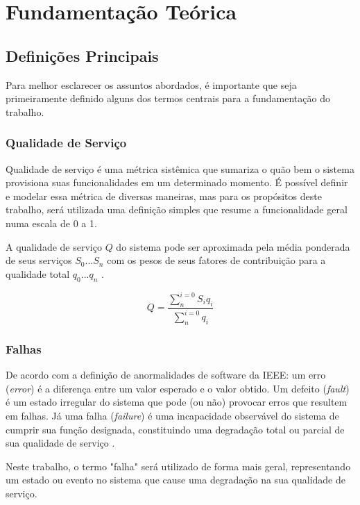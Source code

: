 \chapter{Fundamentação Teórica}
\label{cap:fund}

\section{Definições Principais}

Para melhor esclarecer os assuntos abordados, é importante que seja primeiramente definido alguns dos termos centrais para a fundamentação do trabalho.

\subsection{Qualidade de Serviço}

Qualidade de serviço é uma métrica sistêmica que sumariza o quão bem o sistema provisiona suas funcionalidades em um determinado momento. É possível definir e modelar essa métrica de diversas maneiras, mas para os propósitos deste trabalho, será utilizada uma definição simples que resume a funcionalidade geral numa escala de 0 a 1.

A qualidade de serviço $Q$ do sistema pode ser aproximada pela média ponderada de seus serviços $S_0 ... S_n$ com os pesos de seus fatores de contribuição para a qualidade total $q_0 ... q_n$ \cite{SchedAndOptOfDistributedFT}.

\begin{equation}
    Q = \frac{ \sum^{i = 0}_{n} S_i q_i }{ \sum^{i = 0}_{n} q_i}
\end{equation}


\subsection{Falhas}

De acordo com a definição de anormalidades de software da IEEE: um erro (\textit{error}) é a diferença entre um valor esperado e o valor obtido. Um defeito (\textit{fault}) é um estado irregular do sistema que pode (ou não) provocar erros que resultem em falhas. Já uma falha (\textit{failure}) é uma incapacidade observável do sistema de cumprir sua função designada, constituindo uma degradação total ou parcial de sua qualidade de serviço \cite{IEEEAnormalities}.

Neste trabalho, o termo "falha" será utilizado de forma mais geral, representando um estado ou evento no sistema que cause uma degradação na sua qualidade de serviço.

